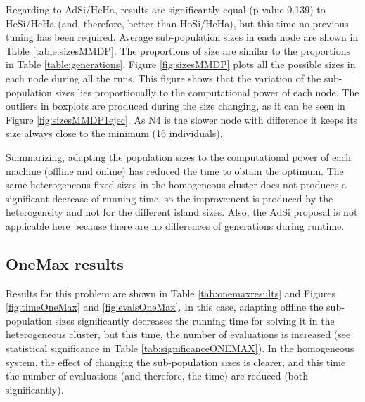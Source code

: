 \documentclass[final,1p,times]{elsarticle}
\begin{document}
Regarding to AdSi/HeHa, results are significantly  equal (p-value 0.139) to HeSi/HeHa (and, therefore, better than HoSi/HeHa), but this time no previous tuning has been required.  Average sub-population sizes in each node are shown in Table \ref{table:sizesMMDP}. The proportions of size are similar to the proportions in Table \ref{table:generations}. Figure \ref{fig:sizesMMDP} plots all the possible sizes in each node during all the runs. This figure shows that the variation of the sub-population sizes lies proportionally to the computational power of each node. The outliers in boxplots are produced during the size changing, as it can be seen in Figure \ref{fig:sizesMMDP1ejec}. As N4 is the slower node with difference it keeps its size always close to the minimum (16 individuals).


\begin{table*}
\end{table*}

Summarizing, adapting the population sizes to the
  computational power of each machine (offline and online) has reduced
  the time to obtain the optimum. The same heterogeneous fixed sizes
  in the homogeneous cluster does not produces a significant decrease
  of running time, so the improvement is produced by the heterogeneity
  and not for the different island sizes. Also, the AdSi proposal is
  not applicable here because there are no differences of generations
  during runtime.



\subsection{OneMax results}

Results for this problem are shown in Table \ref{tab:onemaxresults} and Figures  \ref{fig:timeOneMax} and \ref{fig:evalsOneMax}. In this case, adapting offline the sub-population sizes significantly decreases  the running time for solving it in the heterogeneous cluster, but this time, the number of evaluations is increased (see statistical significance in Table \ref{tab:significanceONEMAX}). In the homogeneous system, the effect of changing the sub-population sizes is clearer, and this time the number of evaluations (and therefore, the time) are reduced (both significantly). 
\end{document}
